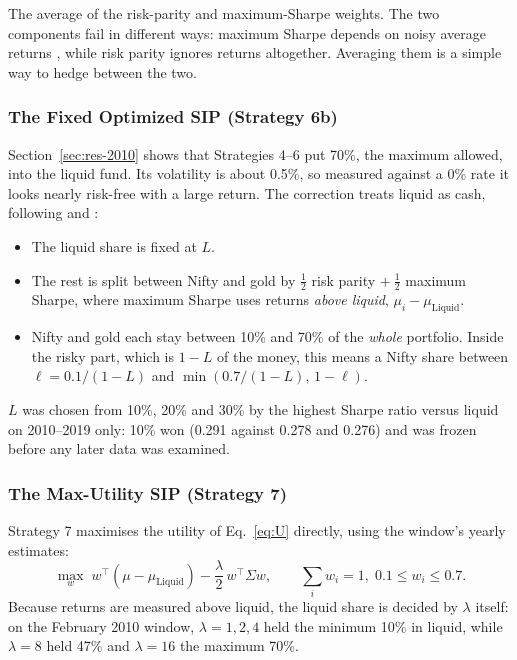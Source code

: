 The average of the risk-parity and maximum-Sharpe weights. The two components fail in different
ways: maximum Sharpe depends on noisy average returns \citep{chopra1993}, while risk parity ignores
returns altogether. Averaging them is a simple way to hedge between the two.

\subsubsection{The Fixed Optimized SIP (Strategy 6b)}
\label{sec:fixed}

Section~\ref{sec:res-2010} shows that Strategies 4--6 put 70\%, the maximum allowed, into the liquid
fund. Its volatility is about 0.5\%, so measured against a 0\% rate it looks nearly risk-free with
a large return. The correction treats liquid as cash, following \citet{tobin1958} and
\citet{sharpe1994}:
\begin{itemize}
  \item The liquid share is fixed at $L$.
  \item The rest is split between Nifty and gold by $\tfrac12$ risk parity $+\ \tfrac12$ maximum
        Sharpe, where maximum Sharpe uses returns \emph{above liquid},
        $\mu_i - \mu_{\text{Liquid}}$.
  \item Nifty and gold each stay between 10\% and 70\% of the \emph{whole} portfolio. Inside the
        risky part, which is $1-L$ of the money, this means a Nifty share between
        $\ell = 0.1/(1-L)$ and $\min\!\left(0.7/(1-L),\, 1 - \ell\right)$.
\end{itemize}
$L$ was chosen from 10\%, 20\% and 30\% by the highest Sharpe ratio versus liquid on 2010--2019 only:
10\% won (0.291 against 0.278 and 0.276) and was frozen before any later data was examined.

\subsubsection{The Max-Utility SIP (Strategy 7)}

Strategy 7 maximises the utility of Eq.~\eqref{eq:U} directly, using the window's yearly estimates:
\begin{equation}
  \max_w \; w^\top(\mu - \mu_{\text{Liquid}}) - \frac{\lambda}{2}\, w^\top \Sigma w ,
  \qquad \textstyle\sum_i w_i = 1,\; 0.1 \le w_i \le 0.7 .
\end{equation}
Because returns are measured above liquid, the liquid share is decided by $\lambda$ itself: on the
February 2010 window, $\lambda = 1, 2, 4$ held the minimum 10\% in liquid, while $\lambda = 8$ held
47\% and $\lambda = 16$ the maximum 70\%.

